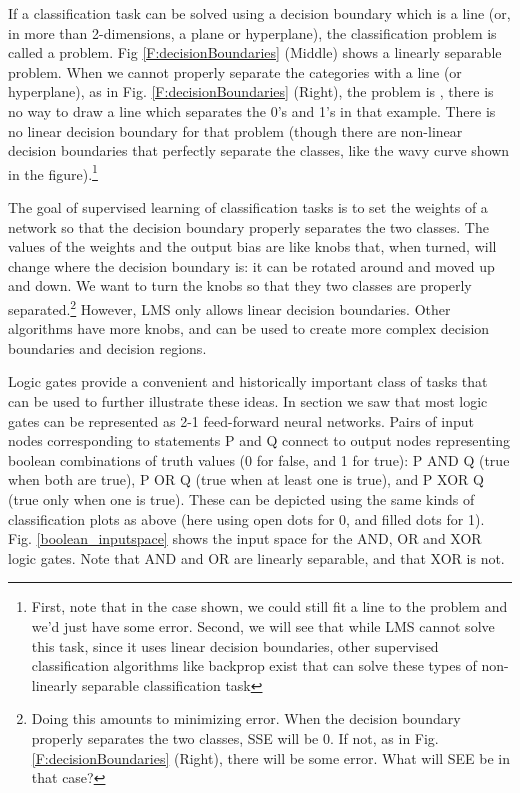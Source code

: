 If a classification task can be solved using a decision boundary which is a line (or, in more than 2-dimensions, a plane or hyperplane), the classification problem is called a  problem. Fig \ref{F:decisionBoundaries} (Middle) shows a linearly separable problem. When we cannot properly separate the categories with a line (or hyperplane), as in  Fig. \ref{F:decisionBoundaries} (Right), the problem is , there is no way to draw a line which separates the 0's and 1's in that example. There is no linear decision boundary for that problem (though there are non-linear decision boundaries that perfectly separate the classes, like the wavy curve shown in the figure).\footnote{First, note that in the case shown, we could still fit a line to the problem and we'd just have some error. Second, we will see that while LMS cannot solve this task, since it uses linear decision boundaries, other supervised classification algorithms like backprop exist that can solve these types of non-linearly separable classification task}

The goal of supervised learning of classification tasks is to set the weights of a network so that the decision boundary properly separates the two classes. The values of the weights and the output bias are like knobs that, when turned, will change where the decision boundary is: it can be rotated around and moved up and down. We want to turn the knobs so that they two  classes are properly separated.\footnote{Doing this amounts to minimizing error. When the decision boundary properly separates the two classes, SSE will be 0. If not, as in Fig. \ref{F:decisionBoundaries} (Right), there will be some error. What will SEE be in that case?}  However, LMS only allows linear decision boundaries. Other algorithms have more knobs, and can be used to create more complex decision boundaries and decision regions.
  
Logic gates provide a convenient and historically important class of tasks that can be used to further illustrate these ideas. In section  we saw that most logic gates can be represented as  2-1 feed-forward neural networks. Pairs of input nodes corresponding to statements P and Q connect to output nodes representing boolean combinations of truth values (0 for false, and 1 for true): P AND Q (true when both are true), P OR Q (true when at least one is true), and P XOR Q (true only when one is true). These can be depicted using the same kinds of classification plots as above (here using open dots for 0, and filled dots for 1). Fig. \ref{boolean_inputspace} shows the input space for the AND, OR and XOR logic gates. Note that AND and OR are linearly separable, and that XOR is not.

